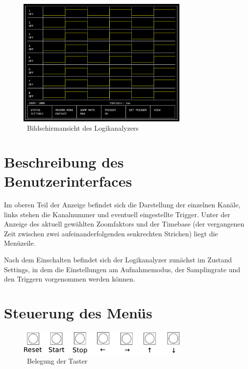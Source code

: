 \documentclass[IN,ngerman,utf8,12pt]{tumbook}
\begin{document}
\begin{figure}[H]
    \centerline{
        \includegraphics[width=0.75\textwidth]{img/bildschirm}
    }
    \label{abb:bildschirm}
    \caption{\ Bildschirmansicht des Logikanalyzers}
\end{figure}

\section{Beschreibung des Benutzerinterfaces}

Im oberen Teil der Anzeige befindet sich die Darstellung der einzelnen Kanäle, links stehen die Kanalnummer und eventuell eingestellte Trigger.
Unter der Anzeige des aktuell gewählten Zoomfaktors und der Timebase (der vergangenen Zeit zwischen zwei aufeinanderfolgenden senkrechten Strichen) liegt die Menüzeile.

Nach dem Einschalten befindet sich der Logikanalyzer zunächst im Zustand \glqq Settings\grqq, in dem die Einstellungen am Aufnahmemodus, der Samplingrate und den Triggern vorgenommen werden können.

\section{Steuerung des Menüs}

\begin{figure}[H]
    \centerline{
        \includegraphics[width=0.75\textwidth]{img/taster}
    }
    \label{abb:taster}
    \caption{\ Belegung der Taster}
\end{figure}
\end{document}
